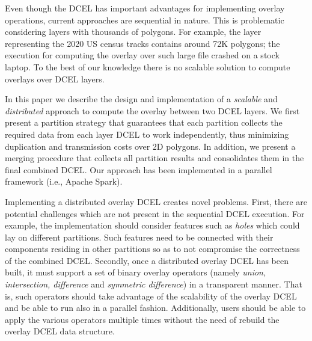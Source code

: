 Even though the DCEL has important advantages for implementing overlay operations, current approaches are sequential in nature.
This is problematic considering layers with thousands of polygons. For example, the layer representing the 2020 US census tracks contains around 72K polygons;
the execution for computing the overlay over such large file crashed on a stock laptop. To the best of our knowledge there is no scalable solution to compute
overlays over DCEL layers.

In this paper we describe the design and implementation of a \textit{scalable} and \textit{distributed} approach to compute the overlay between two DCEL layers.
We first present a partition strategy that guarantees that each partition collects the required data from each layer DCEL to work independently, thus minimizing
duplication and transmission costs over 2D polygons.
In addition, we present a merging procedure that collects all partition results and consolidates them in the final combined DCEL.
Our approach has been implemented in a parallel framework (i.e., Apache Spark).

Implementing a distributed overlay DCEL creates novel problems.
First, there are potential challenges which are not present in the sequential DCEL execution.
For example, the implementation should consider features such as \textit{holes} which could lay on different partitions.
Such features need to be connected with their components residing in other partitions so as to not compromise the correctness of the combined DCEL.
Secondly, once a distributed overlay DCEL has been built, it must support a set of binary overlay operators (namely \textit{union, intersection, difference} and
\textit{symmetric difference}) in a transparent manner.
That is, such operators should take advantage of the scalability of the overlay DCEL and be able to run also in a parallel fashion.
Additionally, users should be able to apply the various operators multiple times without the need of rebuild the overlay DCEL data structure.



